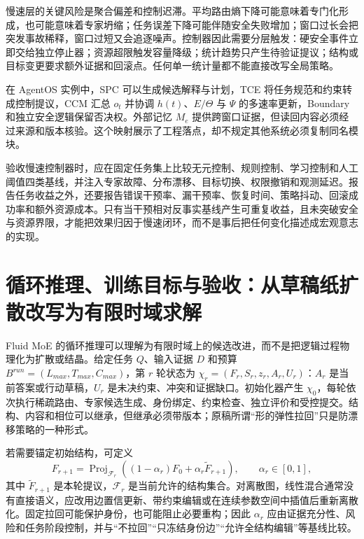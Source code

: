 慢速层的关键风险是聚合偏差和控制迟滞。平均路由熵下降可能意味着专门化形成，也可能意味着专家坍缩；任务误差下降可能伴随安全失败增加；窗口过长会把突发事故稀释，窗口过短又会追逐噪声。控制器因此需要分层触发：硬安全事件立即交给独立停止器；资源超限触发容量降级；统计趋势只产生待验证提议；结构或目标变更要求额外证据和回滚点。任何单一统计量都不能直接改写全局策略。

在 AgentOS 实例中，SPC 可以生成候选解释与计划，TCE 将任务规范和约束转成控制提议，CCM 汇总 $o_t$ 并协调 $h(t)$、$E/\Theta$ 与 $\Psi$ 的多速率更新，Boundary 和独立安全逻辑保留否决权。外部记忆 $M_e$ 提供跨窗口证据，但读回内容必须经过来源和版本核验。这个映射展示了工程落点，却不规定其他系统必须复制同名模块。

验收慢速控制器时，应在固定任务集上比较无元控制、规则控制、学习控制和人工阈值四类基线，并注入专家故障、分布漂移、目标切换、权限撤销和观测延迟。报告任务收益之外，还要报告错误干预率、漏干预率、恢复时间、策略抖动、回滚成功率和额外资源成本。只有当干预相对反事实基线产生可重复收益，且未突破安全与资源界限，才能把效果归因于慢速闭环，而不是事后把任何变化描述成宏观意志的实现。

\section{循环推理、训练目标与验收：从草稿纸扩散改写为有限时域求解}
\label{sec:appendix_fhd_loop}

Fluid MoE 的循环推理可以理解为有限时域上的候选改进，而不是把逻辑过程物理化为扩散或结晶。给定任务 $Q$、输入证据 $D$ 和预算 $B^{run}=(L_{max},T_{max},C_{max})$，第 $r$ 轮状态为 $\chi_r=(F_r,S_r,z_r,A_r,U_r)$：$A_r$ 是当前答案或行动草稿，$U_r$ 是未决约束、冲突和证据缺口。初始化器产生 $\chi_0$，每轮依次执行稀疏路由、专家候选生成、身份绑定、约束检查、独立评价和受控提交。结构、内容和相位可以继承，但继承必须带版本；原稿所谓“形的弹性拉回”只是防漂移策略的一种形式。

若需要锚定初始结构，可定义
\begin{equation}
F_{r+1}=\operatorname{Proj}_{\mathcal F_r}\!\left(
(1-\alpha_r)F_0+\alpha_r\widetilde F_{r+1}
\right),\qquad \alpha_r\in[0,1],
\end{equation}
其中 $\widetilde F_{r+1}$ 是本轮提议，$\mathcal F_r$ 是当前允许的结构集合。对离散图，线性混合通常没有直接语义，应改用边置信更新、带约束编辑或在连续参数空间中插值后重新离散化。固定拉回可能保护身份，也可能阻止必要重构；因此 $\alpha_r$ 应由证据充分性、风险和任务阶段控制，并与“不拉回”“只冻结身份边”“允许全结构编辑”等基线比较。

